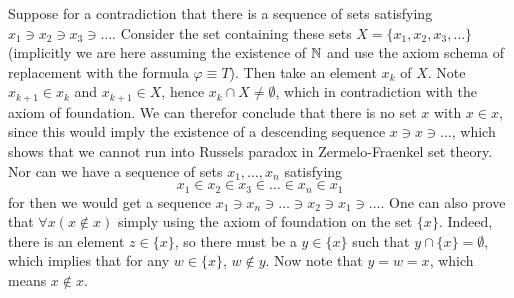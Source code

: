 \begin{example}\label{ASetCannotHaveItselfAsAnElement}
    Suppose for a contradiction that there is a sequence of sets satisfying $x_1\ni x_2\ni x_3\ni\dots$. Consider the set containing these sets $X=\{x_1,x_2,x_3,\dots\}$ (implicitly we are here assuming the existence of $\mathbb{N}$ and use the axiom schema of replacement with the formula $\varphi \equiv T$). Then take an element $x_k$ of $X$. Note $x_{k+1}\in x_k$ and $x_{k+1}\in X$, hence $x_k\cap X\neq \emptyset$, which in contradiction with the axiom of foundation. We can therefor conclude that there is no set $x$ with $x\in x$, since this would imply the existence of a descending sequence $x\ni x\ni \dots$, which shows that we cannot run into Russels paradox in Zermelo-Fraenkel set theory. Nor can we have a sequence of sets $x_1,\dots,x_n$ satisfying 
    $$x_1\in x_2\in x_3\in \dots\in x_n\in x_1$$
    for then we would get a sequence $x_1\ni x_n\ni \dots\ni x_2\ni x_1\ni \dots$. 
    One can also prove that $\forall x(x\notin x)$ simply using the axiom of foundation on the set $\{x\}$. Indeed, there is an element $z\in \{x\}$, so there must be a $y\in\{x\}$ such that $y\cap \{x\} = \emptyset$, which implies that for any $w\in \{x\}$, $w\notin y$. Now note that $y=w=x$, which means $x\notin x$.  
\end{example}

